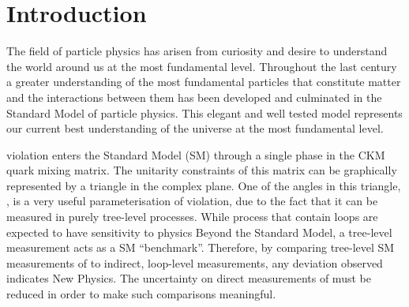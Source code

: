 %


\chapter{\label{ch:1-intro}Introduction} 

The field of particle physics has arisen from curiosity and desire to understand the world around us at the most fundamental level. Throughout the last century a greater understanding of the most fundamental particles that constitute matter and the interactions between them has been developed and culminated in the Standard Model of particle physics. This elegant and well tested model represents our current best understanding of the universe at the most fundamental level.

\CP violation enters the Standard Model (SM) through a single phase in the CKM quark mixing matrix. The unitarity constraints of this matrix can be graphically represented by a triangle in the complex plane. One of the angles in this triangle, \Pgamma, is a very useful parameterisation of \CP violation, due to the fact that it can be measured in purely tree-level processes. While process that contain loops are expected to have sensitivity to physics Beyond the Standard Model, a tree-level measurement acts as a SM ``benchmark''. Therefore, by comparing tree-level SM measurements of \Pgamma to indirect, loop-level measurements, any deviation observed indicates New Physics. The uncertainty on direct measurements of \Pgamma must be reduced in order to make such comparisons meaningful.

